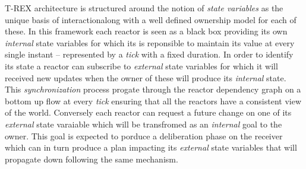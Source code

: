 T-REX architecture is structured around the notion of 
{\em state variables} as the unique basis of interactionalong
with a well defined ownership  model for each of these. 
In this framework each reactor is seen as a
black box providing its own {\em internal} state variables for which
its is reponsible to maintain its value at every single instant --
represented by a {\em tick} with a fixed duration. In order to
identify its state a reactor can subscribe to {\em external} state
variables for  which it will received new updates when the owner of
these will produce its {\em internal} state. This {\em
  synchronization} process progate through the reactor dependency 
graph on a bottom up flow at every {\em tick} ensuring that all the
reactors have a consistent view of the world. Conversely each reactor
can request a future change on one of its {\em external} state
varaiable which will be transfromed as an {\em internal} goal to the
owner. This goal is expected to porduce a deliberation phase on the
receiver which can in turn produce a plan impacting its {\em external}
state variables that will propagate down following the same
mechanism. 


